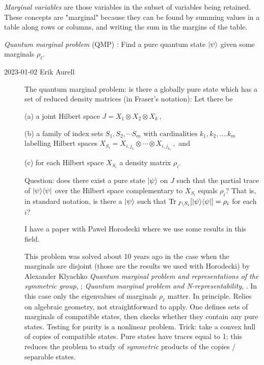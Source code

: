 \emph{Marginal variables} are those variables in the subset of variables being
retained. These concepts are "marginal" because they can be found by summing
values in a table along rows or columns, and writing the sum in the margins
of the table.

\emph{Quantum marginal problem} (QMP) : Find a pure quantum state $\ket{\psi}$
given some marginals $\rho_\ell$.

\begin{description}

\item[2023-01-02 Erik Aurell]
The quantum marginal problem: is
there a globally pure state which has a set of reduced density
matrices (in Fraser's notation): Let there be

(a) a joint Hilbert space
\(
J=X_1 \otimes X_2 \otimes X_k\,,
\)

(b)
a family of index sets
\(S_1, S_2, \cdots S_m
\mbox{ with cardinalities } k_1, k_2, .... k_m
\)
labelling Hilbert spaces
$X_{S_i}={X_{i,j_1} \otimes \cdots \otimes X_{i,j_{k_1}}}
\,,$ and

(c) for each Hilbert space  $X_{S_i}$ a density matrix $\rho_i$.

Question: does there exist a pure state
$\ket{\psi}$ on $J$ such that the partial trace of $\ket{\psi} \bra{\psi}$ over the
Hilbert space complementary to $X_{S_i}$ equals $\rho_i$? That is, in
standard notation, is there a $\ket{\psi}$ such that
$\Tr_{J\setminus{S_i}}[\ket{\psi} \bra{\psi}] = \rho_i$ for each $i$?

I have a paper with Pawel Horodecki
where we use some results in this field. 

This problem was solved about 10 years ago in the case when the marginals are
disjoint (those are the results we used with Horodecki) by
{Alexander Klyachko}
{\em Quantum marginal problem and representations of the symmetric group},
;
{\em Quantum marginal problem and N-representability},
.
In this case only the eigenvalues of marginals $\rho_\ell$ matter. In principle.
Relies on algebraic geometry, not straightforward to apply. One defines sets of
 marginals of compatible states, then checks whether they contain any pure states.
Testing for purity is a nonlinear problem.
Trick: take a convex hull of copies of compatible states. Pure states have traces
equal to 1; this reduces the problem to study of \emph{symmetric} products of the copies /
separable states.


\end{description}
